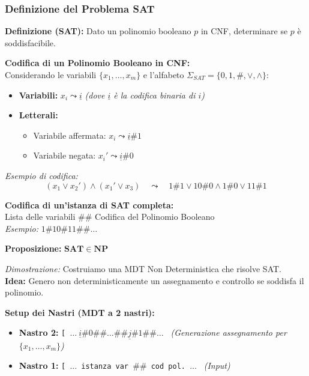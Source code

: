\vspace{0.6cm}
\subsubsection{Definizione del Problema SAT}

\textbf{Definizione (SAT):} Dato un polinomio booleano $p$ in CNF, determinare se $p$ è soddisfacibile.

\vspace{0.4cm}
\textbf{Codifica di un Polinomio Booleano in CNF:} \\
Considerando le variabili $\{x_1, \dots, x_m\}$ e l'alfabeto $\Sigma_{SAT} = \{0, 1, \#, \lor, \land\}$:
\begin{itemize}
    \item \textbf{Variabili:} $x_i \leadsto \underline{i}$ \quad \textit{(dove $\underline{i}$ è la codifica binaria di $i$)}
    \item \textbf{Letterali:} 
    \begin{itemize}
        \item Variabile affermata: $x_i \leadsto \underline{i} \# 1$
        \item Variabile negata: $x_i' \leadsto \underline{i} \# 0$
    \end{itemize}
\end{itemize}

\textit{Esempio di codifica:} 
$$ (x_1 \lor x_2') \land (x_1' \lor x_3) \quad \leadsto \quad 1\#1 \lor 10\#0 \land 1\#0 \lor 11\#1 $$

\vspace{0.5cm}
\textbf{Codifica di un'istanza di SAT completa:} \\
Lista delle variabili $\mathbf{\#\#}$ Codifica del Polinomio Booleano \\
\textit{Esempio:} $1 \# 10 \# 11 \mathbf{\#\#} \dots$

\newpage

\textbf{Proposizione:} $\mathbf{SAT \in NP}$

\textit{Dimostrazione:} Costruiamo una MDT Non Deterministica che risolve SAT. \\
\textbf{Idea:} Genero non deterministicamente un assegnamento e controllo se soddisfa il polinomio.

\vspace{0.2cm}
\textbf{Setup dei Nastri (MDT a 2 nastri):}
\begin{itemize}
    \item \textbf{Nastro 2:} \texttt{[ $\dots \ \underline{i} \# 0 \#\# \dots \#\# \underline{j} \# 1 \#\# \dots$ } \quad \textit{(Generazione assegnamento per $\{x_1, \dots, x_m\}$)}
    \item \textbf{Nastro 1:} \texttt{[ $\dots$ istanza var $\#\#$ cod pol. $\dots$ } \quad \textit{(Input)}
\end{itemize}

